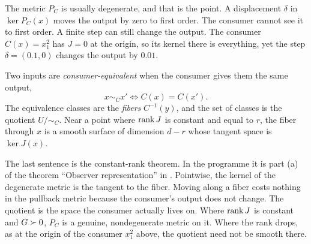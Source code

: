 The metric $P_C$ is usually degenerate, and that is the point. A displacement $\delta$ in $\ker P_C(x)$ moves the output by zero to first order. The consumer cannot see it to first order. A finite step can still change the output. The consumer $C(x)=x_1^2$ has $J=0$ at the origin, so its kernel there is everything, yet the step $\delta=(0.1,0)$ changes the output by $0.01$.

\begin{definition}\label{def:ch05:quotient}
Two inputs are \emph{consumer-equivalent} when the consumer gives them the same output,
\begin{equation}\label{eq:ch05:quotient}
x\sim_C x'\iff C(x)=C(x').
\end{equation}
The equivalence classes are the \emph{fibers} $C^{-1}(y)$, and the set of classes is the quotient $U/\!\sim_C$. Near a point where $\operatorname{rank} J$ is constant and equal to $r$, the fiber through $x$ is a smooth surface of dimension $d-r$ whose tangent space is $\ker J(x)$.
\end{definition}

The last sentence is the constant-rank theorem. In the programme it is part (a) of the theorem ``Observer representation'' in . Pointwise, the kernel of the degenerate metric is the tangent to the fiber. Moving along a fiber costs nothing in the pullback metric because the consumer's output does not change. The quotient is the space the consumer actually lives on. Where $\operatorname{rank} J$ is constant and $G\succ0$, $P_C$ is a genuine, nondegenerate metric on it. Where the rank drops, as at the origin of the consumer $x_1^2$ above, the quotient need not be smooth there.


